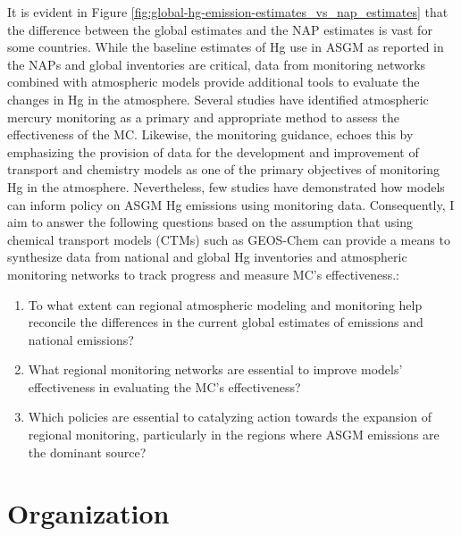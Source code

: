 \begin{flushleft}
 It is evident in Figure \ref{fig:global-hg-emission-estimates_vs_nap_estimates} that the difference between the global estimates and the NAP estimates is vast for some countries. While the baseline estimates of Hg use in ASGM as reported in the NAPs and global inventories are critical, data from monitoring networks combined with atmospheric models provide additional tools to evaluate the changes in Hg in the atmosphere. Several studies have identified atmospheric mercury monitoring as a primary and appropriate method to assess the effectiveness of the MC\cite{sprovieri_atmospheric_2016,evers_evaluating_2016,gustin_measuring_2015,united_nations_environment_programme_technical_2019}. Likewise, the monitoring guidance,\cite{unep_guidance_2021} echoes this by emphasizing the provision of data for the development and improvement of transport and chemistry models as one of the primary objectives of monitoring Hg in the atmosphere. Nevertheless, few studies have demonstrated how models can inform policy on ASGM Hg emissions using monitoring data. Consequently, I aim to answer the following questions based on the assumption that using chemical transport models (CTMs) such as GEOS-Chem can provide a means to synthesize data from national and global Hg inventories and atmospheric monitoring networks to track progress and measure MC's effectiveness.:
\begin{enumerate}
  \item To what extent can regional atmospheric modeling and monitoring help reconcile the differences in the current global estimates of emissions and national emissions?
  \item What regional monitoring networks are essential to improve models' effectiveness in evaluating the MC's effectiveness?
  \item Which policies are essential to catalyzing action towards the expansion of regional monitoring, particularly in the regions where ASGM emissions are the dominant source?
\end{enumerate}
\end{flushleft}




 
\section{Organization}
 
